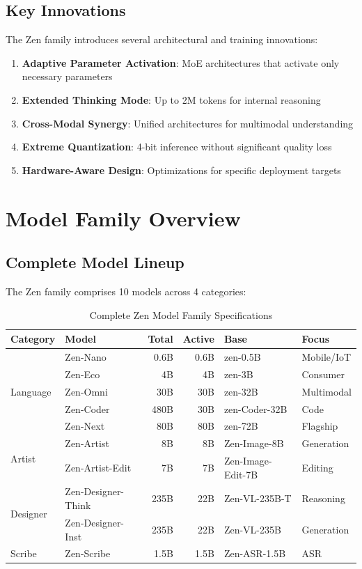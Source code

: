 \documentclass[11pt,a4paper]{article}
\begin{document}
\subsection{Key Innovations}

The Zen family introduces several architectural and training innovations:
\begin{enumerate}
    \item \textbf{Adaptive Parameter Activation}: MoE architectures that activate only necessary parameters
    \item \textbf{Extended Thinking Mode}: Up to 2M tokens for internal reasoning
    \item \textbf{Cross-Modal Synergy}: Unified architectures for multimodal understanding
    \item \textbf{Extreme Quantization}: 4-bit inference without significant quality loss
    \item \textbf{Hardware-Aware Design}: Optimizations for specific deployment targets
\end{enumerate}

\section{Model Family Overview}

\subsection{Complete Model Lineup}

The Zen family comprises 10 models across 4 categories:

\begin{table}[H]
\centering
\small
\begin{tabular}{llrrll}
\toprule
\textbf{Category} & \textbf{Model} & \textbf{Total} & \textbf{Active} & \textbf{Base} & \textbf{Focus} \\
\midrule
\multirow{5}{*}{Language} 
    & Zen-Nano & 0.6B & 0.6B & zen-0.5B & Mobile/IoT \\
    & Zen-Eco & 4B & 4B & zen-3B & Consumer \\
    & Zen-Omni & 30B & 30B & zen-32B & Multimodal \\
    & Zen-Coder & 480B & 30B & zen-Coder-32B & Code \\
    & Zen-Next & 80B & 80B & zen-72B & Flagship \\
\midrule
\multirow{2}{*}{Artist} 
    & Zen-Artist & 8B & 8B & Zen-Image-8B & Generation \\
    & Zen-Artist-Edit & 7B & 7B & Zen-Image-Edit-7B & Editing \\
\midrule
\multirow{2}{*}{Designer} 
    & Zen-Designer-Think & 235B & 22B & Zen-VL-235B-T & Reasoning \\
    & Zen-Designer-Inst & 235B & 22B & Zen-VL-235B & Generation \\
\midrule
Scribe & Zen-Scribe & 1.5B & 1.5B & Zen-ASR-1.5B & ASR \\
\bottomrule
\end{tabular}
\caption{Complete Zen Model Family Specifications}
\end{table}
\end{document}
